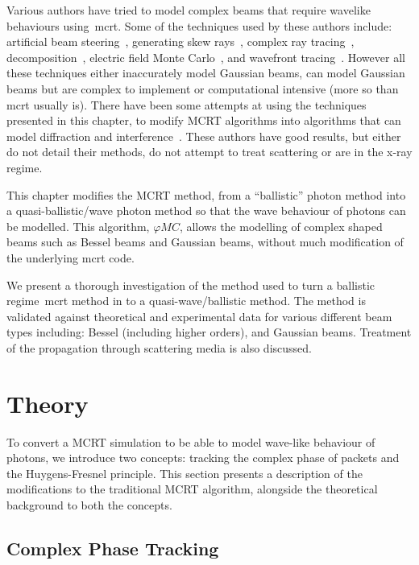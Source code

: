 Various authors have tried to model complex beams that require wavelike behaviours using~\gls*{mcrt}.
Some of the techniques used by these authors include: artificial beam steering~\cite{hokr2015modeling}, generating skew rays~\cite{arnaud1985representation}, complex ray tracing~\cite{harvey2015modeling}, decomposition~\cite{worku2018decomposition}, electric field Monte Carlo~\cite{cai2014electric}, and wavefront tracing~\cite{volpe2017huygens}.
However all these techniques either inaccurately model Gaussian beams, can model Gaussian beams but are complex to implement or computational intensive (more so than \gls*{mcrt} usually is).
There have been some attempts at using the techniques presented in this chapter, to modify MCRT algorithms into algorithms that can model diffraction and interference~\cite{mignon2016fractional,peter2014combining,mahan2018monte,mout2016simulating,fischer2008monte}.
These authors have good results, but either do not detail their methods, do not attempt to treat scattering or are in the x-ray regime.


This chapter modifies the MCRT method, from a ``ballistic'' photon method into a quasi-ballistic/wave photon method so that the wave behaviour of photons can be modelled.
This algorithm, $\varphi MC$, allows the modelling of complex shaped beams such as Bessel beams and Gaussian beams, without much modification of the underlying \gls*{mcrt} code.

We present a thorough investigation of the method used to turn a ballistic regime~\gls*{mcrt} method in to a quasi-wave/ballistic method.
The method is validated against theoretical and experimental data for various different beam types including: Bessel (including higher orders), and Gaussian beams.
Treatment of the propagation through scattering media is also discussed.


\section{Theory}\label{sec:bestheory}

To convert a MCRT simulation to be able to model wave-like behaviour of photons, we introduce two concepts: tracking the complex phase of packets and the Huygens-Fresnel principle.
This section presents a description of the modifications to the traditional MCRT algorithm, alongside the theoretical background to both the concepts.

\subsection{Complex Phase Tracking}

